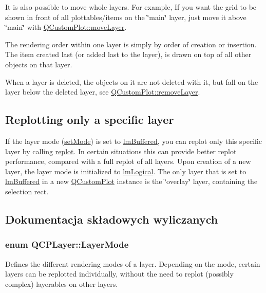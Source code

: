 It is also possible to move whole layers. For example, If you want the grid to be shown in front of all plottables/items on the \char`\"{}main\char`\"{} layer, just move it above \char`\"{}main\char`\"{} with \hyperlink{class_q_custom_plot_ae896140beff19424e9e9e02d6e331104}{Q\+Custom\+Plot\+::move\+Layer}.

The rendering order within one layer is simply by order of creation or insertion. The item created last (or added last to the layer), is drawn on top of all other objects on that layer.

When a layer is deleted, the objects on it are not deleted with it, but fall on the layer below the deleted layer, see \hyperlink{class_q_custom_plot_a40f75e342c5eaab6a86066a42a0e2a94}{Q\+Custom\+Plot\+::remove\+Layer}.\hypertarget{class_q_c_p_layer_qcplayer-buffering}{}\subsection{Replotting only a specific layer}\label{class_q_c_p_layer_qcplayer-buffering}
If the layer mode (\hyperlink{class_q_c_p_layer_a938d57b04f4e4c23cedf1711f983919b}{set\+Mode}) is set to \hyperlink{class_q_c_p_layer_a67dcfc1590be2a1f2227c5a39bb59c7cab581b9fab3007c4c65f057f4185d7538}{lm\+Buffered}, you can replot only this specific layer by calling \hyperlink{class_q_c_p_layer_adefd53b6db02f470151c416f42e37180}{replot}. In certain situations this can provide better replot performance, compared with a full replot of all layers. Upon creation of a new layer, the layer mode is initialized to \hyperlink{class_q_c_p_layer_a67dcfc1590be2a1f2227c5a39bb59c7ca02eb5e9a4cb7f1baf1e2b6b99e3b87ce}{lm\+Logical}. The only layer that is set to \hyperlink{class_q_c_p_layer_a67dcfc1590be2a1f2227c5a39bb59c7cab581b9fab3007c4c65f057f4185d7538}{lm\+Buffered} in a new \hyperlink{class_q_custom_plot}{Q\+Custom\+Plot} instance is the \char`\"{}overlay\char`\"{} layer, containing the selection rect. 

\subsection{Dokumentacja składowych wyliczanych}
\subsubsection[{\texorpdfstring{Layer\+Mode}{LayerMode}}]{\setlength{\rightskip}{0pt plus 5cm}enum {\bf Q\+C\+P\+Layer\+::\+Layer\+Mode}}\hypertarget{class_q_c_p_layer_a67dcfc1590be2a1f2227c5a39bb59c7c}{}\label{class_q_c_p_layer_a67dcfc1590be2a1f2227c5a39bb59c7c}
Defines the different rendering modes of a layer. Depending on the mode, certain layers can be replotted individually, without the need to replot (possibly complex) layerables on other layers.

